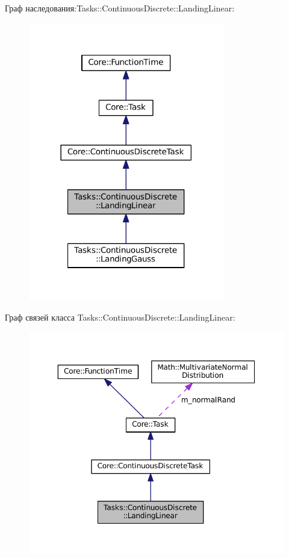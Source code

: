 Граф наследования\+:Tasks\+:\+:Continuous\+Discrete\+:\+:Landing\+Linear\+:
\nopagebreak
\begin{figure}[H]
\begin{center}
\leavevmode
\includegraphics[width=242pt]{class_tasks_1_1_continuous_discrete_1_1_landing_linear__inherit__graph}
\end{center}
\end{figure}


Граф связей класса Tasks\+:\+:Continuous\+Discrete\+:\+:Landing\+Linear\+:
\nopagebreak
\begin{figure}[H]
\begin{center}
\leavevmode
\includegraphics[width=350pt]{class_tasks_1_1_continuous_discrete_1_1_landing_linear__coll__graph}
\end{center}
\end{figure}


